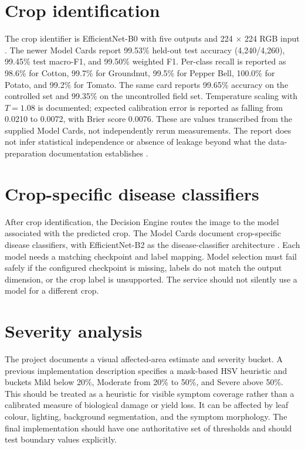 \documentclass[12pt,a4paper,oneside,openany]{report}
\begin{document}
\section{Crop identification}
The crop identifier is EfficientNet-B0 with five outputs and 224 $\times$ 224 RGB input \cite{efficientnet,pytorch_docs}. The newer Model Cards report 99.53\% held-out test accuracy (4,240/4,260), 99.45\% test macro-F1, and 99.50\% weighted F1. Per-class recall is reported as 98.6\% for Cotton, 99.7\% for Groundnut, 99.5\% for Pepper Bell, 100.0\% for Potato, and 99.2\% for Tomato. The same card reports 99.65\% accuracy on the controlled set and 99.35\% on the uncontrolled field set. Temperature scaling with $T=1.08$ is documented; expected calibration error is reported as falling from 0.0210 to 0.0072, with Brier score 0.0076. These are values transcribed from the supplied Model Cards, not independently rerun measurements. The report does not infer statistical independence or absence of leakage beyond what the data-preparation documentation establishes \cite{model_cards,dataset_doc}.

\section{Crop-specific disease classifiers}
After crop identification, the Decision Engine routes the image to the model associated with the predicted crop. The Model Cards document crop-specific disease classifiers, with EfficientNet-B2 as the disease-classifier architecture \cite{model_cards}. Each model needs a matching checkpoint and label mapping. Model selection must fail safely if the configured checkpoint is missing, labels do not match the output dimension, or the crop label is unsupported. The service should not silently use a model for a different crop.

\section{Severity analysis}
The project documents a visual affected-area estimate and severity bucket. A previous implementation description specifies a mask-based HSV heuristic and buckets Mild below 20\%, Moderate from 20\% to 50\%, and Severe above 50\%. This should be treated as a heuristic for visible symptom coverage rather than a calibrated measure of biological damage or yield loss. It can be affected by leaf colour, lighting, background segmentation, and the symptom morphology. The final implementation should have one authoritative set of thresholds and should test boundary values explicitly.
\end{document}
